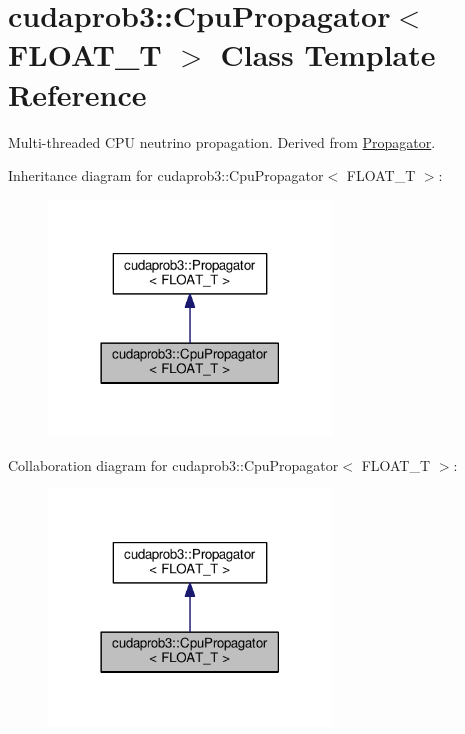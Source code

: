 \hypertarget{classcudaprob3_1_1CpuPropagator}{}\section{cudaprob3\+:\+:Cpu\+Propagator$<$ F\+L\+O\+A\+T\+\_\+T $>$ Class Template Reference}
\label{classcudaprob3_1_1CpuPropagator}


Multi-\/threaded C\+PU neutrino propagation. Derived from \hyperlink{classcudaprob3_1_1Propagator}{Propagator}.  




Inheritance diagram for cudaprob3\+:\+:Cpu\+Propagator$<$ F\+L\+O\+A\+T\+\_\+T $>$\+:\nopagebreak
\begin{figure}[H]
\begin{center}
\leavevmode
\includegraphics[width=213pt]{classcudaprob3_1_1CpuPropagator__inherit__graph}
\end{center}
\end{figure}


Collaboration diagram for cudaprob3\+:\+:Cpu\+Propagator$<$ F\+L\+O\+A\+T\+\_\+T $>$\+:\nopagebreak
\begin{figure}[H]
\begin{center}
\leavevmode
\includegraphics[width=213pt]{classcudaprob3_1_1CpuPropagator__coll__graph}
\end{center}
\end{figure}
